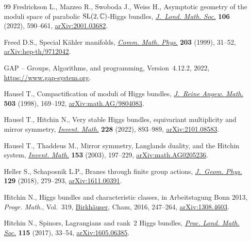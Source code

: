 \documentclass[10pt,a4paper]{amsart}
\numberwithin{equation}{section}
\theoremstyle{definition}
\begin{document}
\begin{thebibliography}{99}
Fredrickson L., Mazzeo R., Swoboda J., Weiss H., Asymptotic geometry of the
 moduli space of parabolic {${\rm SL}(2,{\mathbb C})$}-{H}iggs bundles,
 \href{https://doi.org/10.1112/jlms.12581}{\textit{J.~Lond. Math. Soc.}}
 \textbf{106} (2022), 590--661,
 \href{http://arxiv.org/abs/2001.03682}{arXiv:2001.03682}.

Freed D.S., Special {K}\"{a}hler manifolds,
 \href{https://doi.org/10.1007/s002200050604}{\textit{Comm. Math. Phys.}}
 \textbf{203} (1999), 31--52,
 \href{http://arxiv.org/abs/hep-th/9712042}{arXiv:hep-th/9712042}.

{{GAP} -- {G}roups}, {A}lgorithms, and programming, {V}ersion~4.12.2, 2022,
 \url{https://www.gap-system.org}.

Hausel T., Compactification of moduli of {H}iggs bundles,
 \href{https://doi.org/10.1515/crll.1998.096}{\textit{J.~Reine Angew. Math.}}
 \textbf{503} (1998), 169--192,
 \href{http://arxiv.org/abs/math.AG/9804083}{arXiv:math.AG/9804083}.

Hausel T., Hitchin N., Very stable {H}iggs bundles, equivariant multiplicity
 and mirror symmetry,
 \href{https://doi.org/10.1007/s00222-021-01093-7}{\textit{Invent. Math.}}
 \textbf{228} (2022), 893--989,
 \href{http://arxiv.org/abs/2101.08583}{arXiv:2101.08583}.

Hausel T., Thaddeus M., Mirror symmetry, {L}anglands duality, and the {H}itchin
 system, \href{https://doi.org/10.1007/s00222-003-0286-7}{\textit{Invent.
 Math.}} \textbf{153} (2003), 197--229,
 \href{http://arxiv.org/abs/math.AG0205236}{arXiv:math.AG0205236}.

Heller S., Schaposnik L.P., Branes through finite group actions,
 \href{https://doi.org/10.1016/j.geomphys.2018.03.014}{\textit{J.~Geom.
 Phys.}} \textbf{129} (2018), 279--293,
 \href{http://arxiv.org/abs/1611.00391}{arXiv:1611.00391}.

Hitchin N., Higgs bundles and characteristic classes, in Arbeitstagung {B}onn
 2013, \textit{Progr. Math.}, Vol.~319,
 \href{https://doi.org/10.1007/978-3-319-43648-7_8}{Birkh\"{a}user}, Cham,
 2016, 247--264, \href{http://arxiv.org/abs/1308.4603}{arXiv:1308.4603}.

Hitchin N., Spinors, {L}agrangians and rank~2 {H}iggs bundles,
 \href{https://doi.org/10.1112/plms.12034}{\textit{Proc. Lond. Math. Soc.}}
 \textbf{115} (2017), 33--54,
 \href{http://arxiv.org/abs/1605.06385}{arXiv:1605.06385}.


\end{thebibliography}
\end{document}
